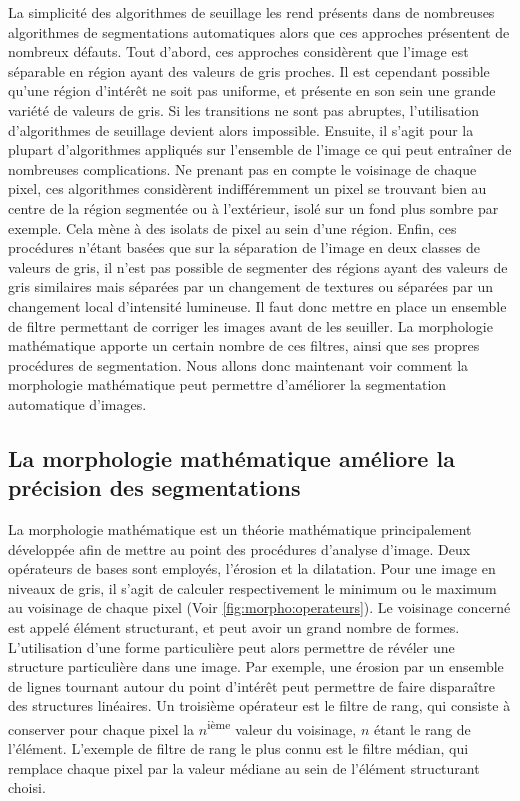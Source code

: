 \documentclass[\main/main.tex]{subfiles}
\begin{document}
%
La simplicité des algorithmes de seuillage les rend présents dans de nombreuses algorithmes de segmentations automatiques alors que  ces approches présentent de nombreux défauts.
%
Tout d'abord, ces approches considèrent que l'image est séparable en région ayant des valeurs de gris proches. Il est cependant possible qu'une région d'intérêt ne soit pas uniforme, et présente en son sein une grande variété de valeurs de gris. Si les transitions ne sont pas abruptes, l'utilisation d'algorithmes de seuillage devient alors impossible.
Ensuite, il s'agit pour la plupart d'algorithmes appliqués sur l'ensemble de l'image ce qui peut entraîner de nombreuses complications.
%
Ne prenant pas en compte le voisinage de chaque pixel, ces algorithmes considèrent indifféremment un pixel se trouvant bien au centre de la région segmentée ou à l'extérieur, isolé sur un fond plus sombre par exemple. Cela mène à des isolats de pixel au sein d'une région.
%
Enfin, ces procédures n'étant basées que sur la séparation de l'image en deux classes de valeurs de gris, il n'est pas possible de segmenter des régions ayant des valeurs de gris similaires mais séparées par un changement de textures ou séparées par un changement local d'intensité lumineuse.
Il faut donc mettre en place un ensemble de filtre permettant de corriger les images avant de les seuiller. La morphologie mathématique apporte un certain nombre de ces filtres, ainsi que ses propres procédures de segmentation.
%
Nous allons donc maintenant voir comment la morphologie mathématique peut permettre d'améliorer la segmentation automatique d'images.

    \subsection{La morphologie mathématique améliore la précision des segmentations}
    
%
La morphologie mathématique est un théorie mathématique principalement développée afin de mettre au point des procédures d'analyse d'image.
%
Deux opérateurs de bases sont employés, l'érosion et la dilatation.
%
Pour une image en niveaux de gris, il s'agit de calculer respectivement le minimum ou le maximum au voisinage de chaque pixel (Voir \autoref{fig:morpho:operateurs}).
%
Le voisinage concerné est appelé élément structurant, et peut avoir un grand nombre de formes.
%
L'utilisation d'une forme particulière peut alors permettre de révéler une structure particulière dans une image.
%
Par exemple, une érosion par un ensemble de lignes tournant autour du point d'intérêt peut permettre de faire disparaître des structures linéaires.
%
Un troisième opérateur est le filtre de rang, qui consiste à conserver pour chaque pixel la $n$\textsuperscript{ième} valeur du voisinage, $n$ étant le rang de l'élément.
%
L'exemple de filtre de rang le plus connu est le filtre médian, qui remplace chaque pixel par la valeur médiane au sein  de l'élément structurant choisi.
\end{document}
